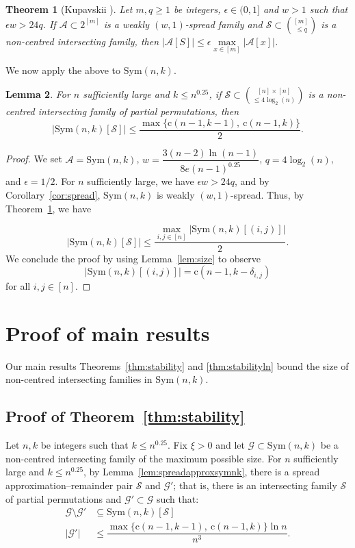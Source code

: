 \documentclass{amsart}
\newtheorem{thm}{Theorem}[section]
\newtheorem{lem}[thm]{Lemma}
\newcommand{\mcal}{\mathcal}
\newcommand{\sym}{\mathrm{Sym}}
\newcommand{\st}{\mathrm{c}}
\begin{document}
\begin{thm}[Kupavskii \cite{kupavskii2026erd}]\label{thm:peelinggeneral}
Let $m,q\geq 1$ be integers, $\epsilon\in (0,1]$ and $w>1$ such that $\epsilon w>24 q$. If $\mcal{A}\subset 2^{[m]}$ is a weakly $(w,1)$-spread family and $\mcal{S} \subset \binom{[m]}{\leq q}$ is a non-centred intersecting family, then 
$|\mcal{A}[S]| \leq \epsilon \max\limits_{x \in [m]}|\mcal{A}[x]|$.
\end{thm} 

We now apply the above to $\sym(n,k)$.

\begin{lem}\label{lem:peelingsymnk}
For $n$ sufficiently large and $k\leq n^{0.25}$, if $\mcal{S}\subset \binom{[n]\times [n]}{\leq 4\log_{2}(n)}$  is a non-centred intersecting family of partial permutations, then  
\[|\sym(n,k)[\mcal{S}]| \leq \frac{\max\{\st(n-1,k-1),\ \st(n-1,k)\}}{2}.\]
\end{lem}
\begin{proof}
We set $\mcal{A}=\sym(n,k)$,  $w=\dfrac{3(n-2)\ln(n-1)}{8e (n-1)^{0.25}}$, $q=4\log_{2}(n)$, and $\epsilon=1/2$. For $n$ sufficiently large, we have $\epsilon w>24 q$, and by Corollary~\ref{cor:spread}, $\sym(n,k)$ is weakly $(w,1)$-spread. Thus, by Theorem~\ref{thm:peelinggeneral}, we have

\[|\sym(n,k)[\mcal{S}]| \leq \frac{\max\limits_{i,j\in [n] }|\sym(n,k)[(i,j)]|}{2}.\] We conclude the proof by using Lemma~\ref{lem:size} to observe \[|\sym(n,k)[(i,j)]|= \st(n-1,k-\delta_{i,j})\] for all $i,j\in [n].$
\end{proof}
\section{Proof of main results}\label{sec:proof}
Our main results Theorems~\ref{thm:stability} and \ref{thm:stabilityln} bound the size of non-centred intersecting families in $\sym(n,k)$.

\subsection*{Proof of Theorem~\ref{thm:stability}}
Let $n,k$ be integers such that $k\leq n^{0.25}$. Fix $\xi >0$ and let $\mcal{G}\subset \sym(n,k)$ be a non-centred intersecting family of the maximum possible size. For $n$ sufficiently large and $k\leq n^{0.25}$, by Lemma~\ref{lem:spreadapproxsymnk}, there is a spread approximation--remainder pair $\mcal{S}$ and $\mcal{G}'$; that is, there is an intersecting family $\mcal{S}$ of partial permutations and $\mcal{G}'\subset \mcal{G}$ such that:
\begin{subequations}\label{eq:sppx}
\begin{align}
\mcal{G} \setminus \mcal{G}' &\subseteq \sym(n,k)[\mcal{S}] \\
|\mcal{G}'|&\leq \dfrac{\max\{\st(n-1,k-1),\ \st(n-1,k)\} \ln n}{n^{3}}.
\end{align}
\end{subequations}
\end{document}

